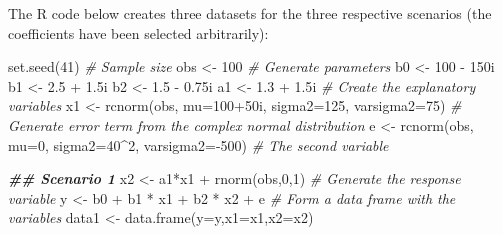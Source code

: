 \documentclass[
]{book}
\newenvironment{Shaded}{\begin{snugshade}}{\end{snugshade}}
\newcommand{\AttributeTok}[1]{\textcolor[rgb]{0.77,0.63,0.00}{#1}}
\newcommand{\CommentTok}[1]{\textcolor[rgb]{0.56,0.35,0.01}{\textit{#1}}}
\newcommand{\DecValTok}[1]{\textcolor[rgb]{0.00,0.00,0.81}{#1}}
\newcommand{\DocumentationTok}[1]{\textcolor[rgb]{0.56,0.35,0.01}{\textbf{\textit{#1}}}}
\newcommand{\FloatTok}[1]{\textcolor[rgb]{0.00,0.00,0.81}{#1}}
\newcommand{\FunctionTok}[1]{\textcolor[rgb]{0.00,0.00,0.00}{#1}}
\newcommand{\NormalTok}[1]{#1}
\newcommand{\OtherTok}[1]{\textcolor[rgb]{0.56,0.35,0.01}{#1}}
\newcommand{\SpecialCharTok}[1]{\textcolor[rgb]{0.00,0.00,0.00}{#1}}
\begin{document}
The R code below creates three datasets for the three respective scenarios (the coefficients have been selected arbitrarily):

\begin{Shaded}
\begin{Highlighting}[]
\FunctionTok{set.seed}\NormalTok{(}\DecValTok{41}\NormalTok{)}
\CommentTok{\# Sample size}
\NormalTok{obs }\OtherTok{\textless{}{-}} \DecValTok{100}
\CommentTok{\# Generate parameters}
\NormalTok{b0 }\OtherTok{\textless{}{-}} \DecValTok{100} \SpecialCharTok{{-}}\NormalTok{ 150i}
\NormalTok{b1 }\OtherTok{\textless{}{-}} \FloatTok{2.5} \SpecialCharTok{+} \FloatTok{1.5}\NormalTok{i}
\NormalTok{b2 }\OtherTok{\textless{}{-}} \FloatTok{1.5} \SpecialCharTok{{-}} \FloatTok{0.75}\NormalTok{i}
\NormalTok{a1 }\OtherTok{\textless{}{-}} \FloatTok{1.3} \SpecialCharTok{+} \FloatTok{1.5}\NormalTok{i}
\CommentTok{\# Create the explanatory variables}
\NormalTok{x1 }\OtherTok{\textless{}{-}} \FunctionTok{rcnorm}\NormalTok{(obs, }\AttributeTok{mu=}\DecValTok{100}\SpecialCharTok{+}\NormalTok{50i, }\AttributeTok{sigma2=}\DecValTok{125}\NormalTok{, }\AttributeTok{varsigma2=}\DecValTok{75}\NormalTok{)}
\CommentTok{\# Generate error term from the complex normal distribution}
\NormalTok{e }\OtherTok{\textless{}{-}} \FunctionTok{rcnorm}\NormalTok{(obs, }\AttributeTok{mu=}\DecValTok{0}\NormalTok{, }\AttributeTok{sigma2=}\DecValTok{40}\SpecialCharTok{\^{}}\DecValTok{2}\NormalTok{, }\AttributeTok{varsigma2=}\SpecialCharTok{{-}}\DecValTok{500}\NormalTok{)}
\CommentTok{\# The second variable}

\DocumentationTok{\#\# Scenario 1}
\NormalTok{x2 }\OtherTok{\textless{}{-}}\NormalTok{ a1}\SpecialCharTok{*}\NormalTok{x1 }\SpecialCharTok{+} \FunctionTok{rnorm}\NormalTok{(obs,}\DecValTok{0}\NormalTok{,}\DecValTok{1}\NormalTok{)}
\CommentTok{\# Generate the response variable}
\NormalTok{y }\OtherTok{\textless{}{-}}\NormalTok{ b0 }\SpecialCharTok{+}\NormalTok{ b1 }\SpecialCharTok{*}\NormalTok{ x1 }\SpecialCharTok{+}\NormalTok{ b2 }\SpecialCharTok{*}\NormalTok{ x2 }\SpecialCharTok{+}\NormalTok{ e}
\CommentTok{\# Form a data frame with the variables}
\NormalTok{data1 }\OtherTok{\textless{}{-}} \FunctionTok{data.frame}\NormalTok{(}\AttributeTok{y=}\NormalTok{y,}\AttributeTok{x1=}\NormalTok{x1,}\AttributeTok{x2=}\NormalTok{x2)}


\end{Highlighting}
\end{Shaded}
\end{document}
